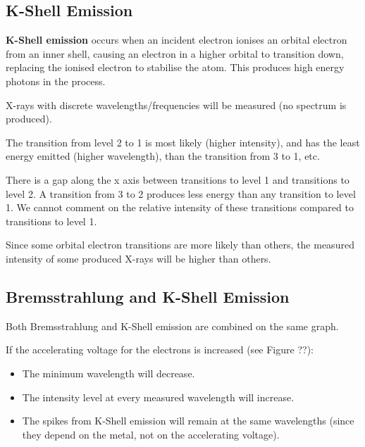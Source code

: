 \documentclass[a4paper,11pt]{report}
\begin{document}
\subsection{K-Shell Emission}


\textbf{K-Shell emission} occurs when an incident electron ionises an orbital
electron from an inner shell, causing an electron in a higher orbital to
transition down, replacing the ionised electron to stabilise the atom. This
produces high energy photons in the process.

X-rays with discrete wavelengths/frequencies will be measured (no spectrum is
produced).

The transition from level 2 to 1 is most likely (higher intensity), and has
the least energy emitted (higher wavelength), than the transition from 3 to 1,
etc.

There is a gap along the x axis between transitions to level 1 and transitions
to level 2. A transition from 3 to 2 produces less energy than any transition
to level 1. We cannot comment on the relative intensity of these transitions
compared to transitions to level 1.

Since some orbital electron transitions are more likely than others, the
measured intensity of some produced X-rays will be higher than others.

\subsection{Bremsstrahlung and K-Shell Emission}


Both Bremsstrahlung and K-Shell emission are combined on the same graph.

If the accelerating voltage for the electrons is increased (see Figure ??):

\begin{itemize}
\item The minimum wavelength will decrease.
\item The intensity level at every measured wavelength will increase.
\item The spikes from K-Shell emission will remain at the same wavelengths
	(since they depend on the metal, not on the accelerating voltage).
\end{itemize}
\end{document}
